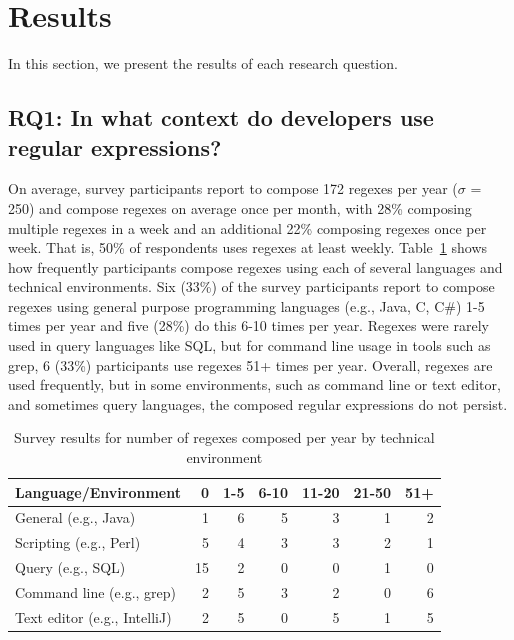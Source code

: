 \section{Results}
\label{sec:results}



In this section, we present the results of each research question.

\subsection{RQ1: In what context do developers use regular expressions?}
\label{rq1:survey}

On average, survey participants report to compose 172 regexes per year ($\sigma$ = 250) and compose regexes on average once per month, with 28\% composing multiple regexes in a week and an additional 22\% composing regexes once per week. That is, 50\% of respondents uses regexes at least weekly. 
Table~\ref{tab:regexenviron} shows how frequently participants compose regexes using each of several languages and technical environments.
Six (33\%) of the survey participants report to compose regexes using general purpose programming languages (e.g., Java, C, C\#) 1-5 times per year and five (28\%) do this 6-10 times per year.  Regexes were rarely used in query languages like SQL, but for command line usage in tools such as grep, 6 (33\%) participants use regexes 51+ times per year. Overall, regexes are used frequently, but in some environments, such as command line or text editor, and sometimes query languages, the composed regular expressions do not persist.

\newcommand{\horiz}{\hspace{2.1pt}}

\begin{table}
\caption{Survey results for number of regexes composed per year by technical environment \label{tab:regexenviron}}
\begin{center}
\begin{small}
\begin{tabular}{l | r @{  \horiz} r @{ \horiz } r @{ \horiz } r @{ \horiz } r @{ \horiz } r }
Language/Environment & 0 & 1-5 & 6-10 & 11-20 & 21-50 & 51+ \\ \hline
General  (e.g., Java)  & 1 & 6 & 5 & 3& 1& 2 \\
Scripting  (e.g., Perl) &5 &4 &3 &3 &2  &1 \\
Query  (e.g., SQL) & 15&2 &0 &0 &1  & 0\\
Command line (e.g., grep)   &2 &5 &3 &2 &0  &6 \\
Text editor (e.g., IntelliJ)   & 2& 5& 0& 5& 1& 5\\
\end{tabular}
\end{small}
\end{center}
\end{table}

